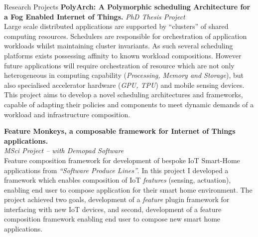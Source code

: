 \documentclass{resume} %
\begin{document}
\begin{rSection}{Research Projects}
{\bf PolyArch: A Polymorphic scheduling Architecture for a Fog Enabled Internet of Things.}
{\textit{PhD Thesis Project}}\\
Large scale distributed applications are supported by  ``clusters'' of shared computing resources. Schedulers are responsible for orchestration of application workloads whilst maintaining cluster invariants. As such several scheduling platforms exists possessing affinity to known workload compositions. However future applications will require orchestration of resource which are not only heterogeneous in computing capability (\textit{Processing, Memory and Storage}), but also specialised accelerator hardware (\textit{GPU, TPU}) and mobile sensing devices. This project aims to develop a novel scheduling architectures and frameworks, capable of adapting their  policies and components to meet dynamic demands of a workload and infrastructure composition. 

{\bf Feature Monkeys, a composable framework for Internet of Things applications.}\\
{\textit {MSci Project -- with Demopad Software}}\\
Feature composition framework for development of bespoke IoT Smart-Home applications from \textit{``Software Produce Lines''}. In this project I developed a framework which enables composition of IoT \textit{features} (sensing, actuation), enabling end user to compose application for their smart home environment. The project achieved two goals, development of a \textit{feature} plugin framework for interfacing with new IoT devices, and second, development of a feature composition framework enabling end user to compose  new smart home applications.
\end{rSection}
\end{document}
